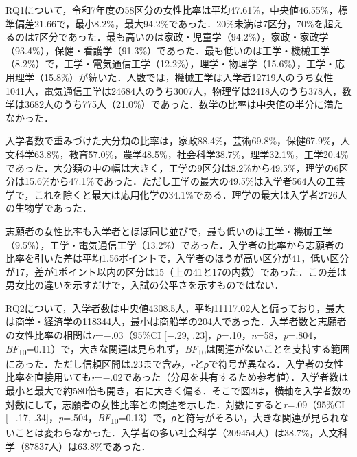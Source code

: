 \documentclass[a4paper,10pt,twocolumn]{ltjsarticle}
\makeatletter
\renewcommand{\section}{\@startsection{section}{1}{\z@}{1.1\Cvs \@plus.4\Cdp \@minus.2\Cdp}{.5\Cvs \@plus.2\Cdp}{\normalfont\gtfamily\bfseries\large}}
\makeatother
\begin{document}
\section{結果}
RQ1について，令和7年度の58区分の女性比率は平均47.61\%，中央値46.55\%，標準偏差21.66で，最小8.2\%，最大94.2\%であった．20\%未満は7区分，70\%を超えるのは7区分であった．最も高いのは家政・児童学（94.2\%），家政・家政学（93.4\%），保健・看護学（91.3\%）であった．最も低いのは工学・機械工学（8.2\%）で，工学・電気通信工学（12.2\%），理学・物理学（15.6\%），工学・応用理学（15.8\%）が続いた．人数では，機械工学は入学者12719人のうち女性1041人，電気通信工学は24684人のうち3007人，物理学は2418人のうち378人，数学は3682人のうち775人（21.0\%）であった．数学の比率は中央値の半分に満たなかった．

入学者数で重みづけた大分類の比率は，家政88.4\%，芸術69.8\%，保健67.9\%，人文科学63.8\%，教育57.0\%，農学48.5\%，社会科学38.7\%，理学32.1\%，工学20.4\%であった．大分類の中の幅は大きく，工学の9区分は8.2\%から49.5\%，理学の6区分は15.6\%から47.1\%であった．ただし工学の最大の49.5\%は入学者564人の工芸学で，これを除くと最大は応用化学の34.1\%である．理学の最大は入学者2726人の生物学であった．

志願者の女性比率も入学者とほぼ同じ並びで，最も低いのは工学・機械工学（9.5\%），工学・電気通信工学（13.2\%）であった．入学者の比率から志願者の比率を引いた差は平均1.56ポイントで，入学者のほうが高い区分が41，低い区分が17，差が1ポイント以内の区分は15（上の41と17の内数）であった．この差は男女比の違いを示すだけで，入試の公平さを示すものではない．

RQ2について，入学者数は中央値4308.5人，平均11117.02人と偏っており，最大は商学・経済学の118344人，最小は商船学の204人であった．入学者数と志願者の女性比率の相関は\textit{r}=−.03（95\%CI [−.29, .23]，\textit{ρ}=.10，\textit{n}=58，\textit{p}=.804，\textit{BF}\textsubscript{10}=0.11）で，大きな関連は見られず，\textit{BF}\textsubscript{10}は関連がないことを支持する範囲にあった．ただし信頼区間は.23まで含み，\textit{r}と\textit{ρ}で符号が異なる．入学者の女性比率を直接用いても\textit{r}=−.02であった（分母を共有するため参考値）．入学者数は最小と最大で約580倍も開き，右に大きく偏る．そこで図2は，横軸を入学者数の対数にして，志願者の女性比率との関連を示した．対数にすると\textit{r}=.09（95\%CI [−.17, .34]，\textit{p}=.504，\textit{BF}\textsubscript{10}=0.13）で，\textit{ρ}と符号がそろい，大きな関連が見られないことは変わらなかった．入学者の多い社会科学（209454人）は38.7\%，人文科学（87837人）は63.8\%であった．
\end{document}
